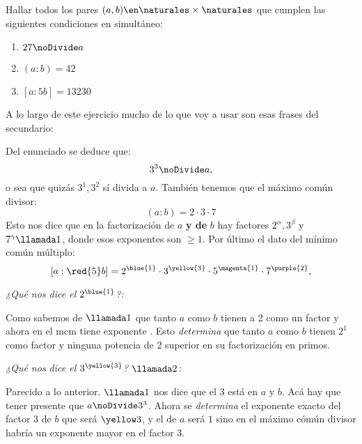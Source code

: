\begin{enunciado}{\ejExtra}
  Hallar todos los pares $(a,b) \en \naturales \times \naturales$ que cumplen las siguientes condiciones en simultáneo:
  \begin{multicols}{3}
    \begin{enumerate}[label=]
      \item $27 \noDivide a$
      \item $(a:b) = 42$
      \item $[a:5b] = 13230$
    \end{enumerate}
  \end{multicols}
\end{enunciado}

A lo largo de este ejercicio mucho de lo que voy a usar son esas frases del secundario:


\bigskip

Del enunciado se deduce que:
$$
  3^3 \noDivide a,
$$
o sea que quizás $3^1,3^2$ sí divida a $a$. También tenemos que el máximo común divisor:
$$
  (a:b) = 2 \cdot 3 \cdot 7
$$
Esto nos dice que en la factorización de $a$ \textbf{y de} $b$ hay factores $2^\alpha, 3^\beta$ y $7^\gamma \llamada1$, donde esos exponentes son $\geq 1$.
Por último el dato del mínimo común múltiplo:
$$
  [a:\red{5}b] = 2^{\blue{1}} \cdot 3^{\yellow{3}} \cdot 5^{\magenta{1}} \cdot 7^{\purple{2}},
$$

\textit{¿Qué nos dice el $2^{\blue{1}}$?:}\par
Como sabemos de $\llamada1$ que tanto $a$ como $b$ tienen a 2 como un factor y ahora en el mcm tiene exponente . Esto
\textit{determina} que tanto $a$ como $b$ tienen $2^1$ como factor y ninguna potencia de 2 superior en su factorización en primos.

\bigskip

\textit{¿Qué nos dice el $3^{\yellow{3}}$? $\llamada2$:}\par
Parecido a lo anterior. $\llamada1$ nos dice que el 3 está en $a$ y $b$. Acá hay que tener presente que $a \noDivide 3^3$.
Ahora se \textit{determina} el exponente exacto del factor 3 de $b$ que será $\yellow3$, y el de $a$ será $1$ sino en el máximo cómún divisor
habría un exponente mayor en el factor 3.

